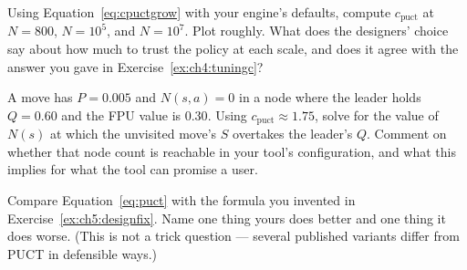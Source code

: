 \begin{exercises}
 Using Equation~\eqref{eq:cpuctgrow} with your
engine's defaults, compute $c_{\text{puct}}$ at $N = 800$, $N = 10^5$, and $N = 10^7$. Plot
roughly. What does the designers' choice say about how much to trust the policy at each
scale, and does it agree with the answer you gave in Exercise~\ref{ex:ch4:tuningc}?

 A move has $P = 0.005$ and $N(s,a)=0$ in
a node where the leader holds $Q = 0.60$ and the FPU value is $0.30$. Using
$c_{\text{puct}} \approx 1.75$, solve for the value of $N(s)$ at which the unvisited move's
$S$ overtakes the leader's $Q$. Comment on whether that node count is reachable in your
tool's configuration, and what this implies for what the tool can promise a user.

 Compare Equation~\eqref{eq:puct} with the formula you invented in
Exercise~\ref{ex:ch5:designfix}. Name one thing yours does better and one thing it does
worse. (This is not a trick question --- several published variants differ from PUCT in
defensible ways.)

\end{exercises}
